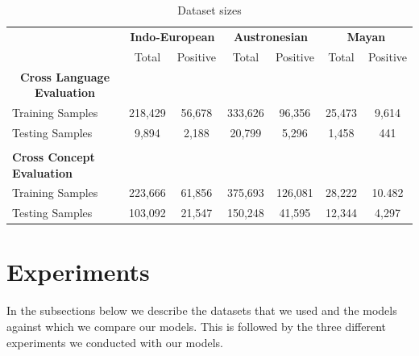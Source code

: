\documentclass[11pt,letterpaper]{article}
\begin{document}
\begin{table}[t]
\centering
\begin{tabular}{lcccccc}
\multicolumn{1}{c}{\textbf{}} & \multicolumn{2}{c}{\textbf{Indo-European}} & \multicolumn{2}{c}{\textbf{Austronesian}} & \multicolumn{2}{c}{\textbf{Mayan}} \\
\multicolumn{1}{c}{}          & Total               & Positive             & Total               & Positive            & Total           & Positive         \\
\multicolumn{1}{c}{\textbf{Cross Language Evaluation}} & \multicolumn{2}{c}{\textbf{}}               &                 &                &             &             \\
Training Samples              & 218,429             & 56,678               & 333,626             & 96,356              & 25,473          & 9,614            \\
Testing Samples               & 9,894               & 2,188                & 20,799              & 5,296               & 1,458           & 441             \\
                                                       &                      &                      &                 &                &             &             \\
\textbf{Cross Concept Evaluation}                      &                      &                      &                 &                &             &             \\
Training Samples              & 223,666             & 61,856               & 375,693             & 126,081             & 28,222          & 10.482           \\
Testing Samples               & 103,092             & 21,547               & 150,248             & 41,595              & 12,344          & 4,297                       
\end{tabular}
\caption{Dataset sizes}
\label{C_count}
\end{table}

\section{Experiments}

In the subsections below we describe the datasets that we used and the models against which we compare our models. This is followed by the three different experiments we conducted with our models.
\end{document}
